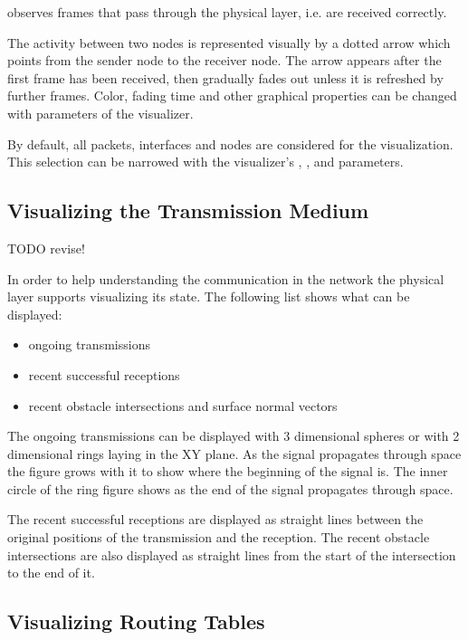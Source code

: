  observes frames that pass through the physical layer,
i.e. are received correctly.

The activity between two nodes is represented visually by a dotted arrow which
points from the sender node to the receiver node. The arrow appears after the
first frame has been received, then gradually fades out unless it is refreshed
by further frames. Color, fading time and other graphical properties can be
changed with parameters of the visualizer.

By default, all packets, interfaces and nodes are considered for the
visualization. This selection can be narrowed with the visualizer's
, , and  parameters.

\ifdraft
\subsection{Visualizing the Transmission Medium}
\label{sec:visualization:the-transmission-medium}

TODO revise!

In order to help understanding the communication in the network the physical
layer supports visualizing its state. The following list shows what can be
displayed:

\begin{itemize}
  \item ongoing transmissions
  \item recent successful receptions
  \item recent obstacle intersections and surface normal vectors
\end{itemize}

The ongoing transmissions can be displayed with 3 dimensional spheres or with 2
dimensional rings laying in the XY plane. As the signal propagates through space
the figure grows with it to show where the beginning of the signal is. The inner
circle of the ring figure shows as the end of the signal propagates through
space. 

The recent successful receptions are displayed as straight lines between the
original positions of the transmission and the reception. The recent obstacle
intersections are also displayed as straight lines from the start of the
intersection to the end of it.
\fi

\subsection{Visualizing Routing Tables}
\label{sec:visualization:routing-tables}

